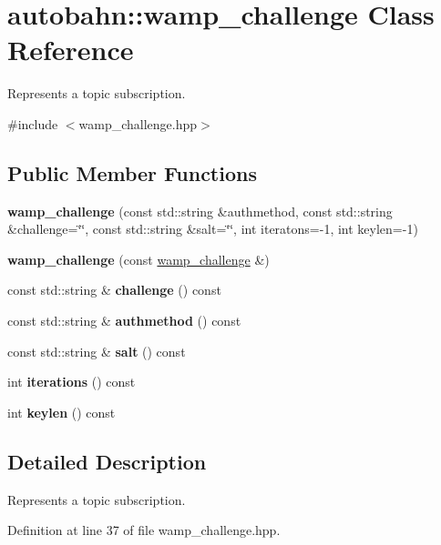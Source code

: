 \hypertarget{classautobahn_1_1wamp__challenge}{}\section{autobahn\+:\+:wamp\+\_\+challenge Class Reference}
\label{classautobahn_1_1wamp__challenge}


Represents a topic subscription.  




{\ttfamily \#include $<$wamp\+\_\+challenge.\+hpp$>$}

\subsection*{Public Member Functions}
\begin{DoxyCompactItemize}
\item 
{\bfseries wamp\+\_\+challenge} (const std\+::string \&authmethod, const std\+::string \&challenge=\char`\"{}\char`\"{}, const std\+::string \&salt=\char`\"{}\char`\"{}, int iteratons=-\/1, int keylen=-\/1)\hypertarget{classautobahn_1_1wamp__challenge_adb8c2a047fdf0ac2d0329be9d83aac69}{}\label{classautobahn_1_1wamp__challenge_adb8c2a047fdf0ac2d0329be9d83aac69}

\item 
{\bfseries wamp\+\_\+challenge} (const \hyperlink{classautobahn_1_1wamp__challenge}{wamp\+\_\+challenge} \&)\hypertarget{classautobahn_1_1wamp__challenge_a63fff6f796f929e45c53e3b97fc1c1af}{}\label{classautobahn_1_1wamp__challenge_a63fff6f796f929e45c53e3b97fc1c1af}

\item 
const std\+::string \& {\bfseries challenge} () const \hypertarget{classautobahn_1_1wamp__challenge_af455935d964f1e8a0653a22c15b203b5}{}\label{classautobahn_1_1wamp__challenge_af455935d964f1e8a0653a22c15b203b5}

\item 
const std\+::string \& {\bfseries authmethod} () const \hypertarget{classautobahn_1_1wamp__challenge_a908e01a12b7ac213b6068e77eebde7f4}{}\label{classautobahn_1_1wamp__challenge_a908e01a12b7ac213b6068e77eebde7f4}

\item 
const std\+::string \& {\bfseries salt} () const \hypertarget{classautobahn_1_1wamp__challenge_a57bb808bce0c17a2d931784d2d72c899}{}\label{classautobahn_1_1wamp__challenge_a57bb808bce0c17a2d931784d2d72c899}

\item 
int {\bfseries iterations} () const \hypertarget{classautobahn_1_1wamp__challenge_abe012a849e0be7c51f11198b7aa7dbe0}{}\label{classautobahn_1_1wamp__challenge_abe012a849e0be7c51f11198b7aa7dbe0}

\item 
int {\bfseries keylen} () const \hypertarget{classautobahn_1_1wamp__challenge_a9d2bbd4d04b83e33a0cbe2ea37ab8702}{}\label{classautobahn_1_1wamp__challenge_a9d2bbd4d04b83e33a0cbe2ea37ab8702}

\end{DoxyCompactItemize}


\subsection{Detailed Description}
Represents a topic subscription. 

Definition at line 37 of file wamp\+\_\+challenge.\+hpp.

